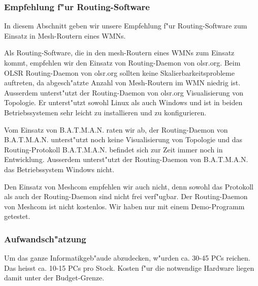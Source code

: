 \subsubsection{Empfehlung f"ur Routing-Software}

In diesem Abschnitt geben wir unsere Empfehlung f"ur Routing-Software
zum Einsatz in Mesh-Routern eines WMNs.

Als Routing-Software, die in den mesh-Routern eines WMNs zum Einsatz kommt,
empfehlen wir den Einsatz von Routing-Daemon von olsr.org. Beim OLSR
Routing-Daemon von olsr.org sollten keine Skalierbarkeitsprobleme auftreten,
da abgesch"atzte Anzahl von Mesh-Routern im WMN niedrig ist. Ausserdem
unterst"utzt der Routing-Daemon von olsr.org Visualisierung von Topologie.
Er unterst"utzt sowohl Linux als auch Windows und ist in beiden
Betriebssystemen sehr leicht zu installieren und zu konfigurieren.

Vom Einsatz von B.A.T.M.A.N. raten wir ab, der Routing-Daemon von
B.A.T.M.A.N. unterst"utzt noch keine Visualisierung von Topologie
und das Routing-Protokoll B.A.T.M.A.N.  befindet sich zur Zeit immer
noch in Entwicklung.  Ausserdem unterst"utzt der Routing-Daemon von
B.A.T.M.A.N. das Betriebssystem Windows nicht.

Den Einsatz von Meshcom empfehlen wir auch nicht, denn sowohl das
Protokoll als auch der Routing-Daemon sind nicht frei verf"ugbar.
Der Routing-Daemon von Meshcom ist nicht kostenlos. Wir haben nur mit
einem Demo-Programm getestet.

\subsubsection{Aufwandsch"atzung}
\label{sec:Aufwandsch"atzung}
	
Um das ganze Informatikgeb"aude abzudecken, w"urden ca. 30-45 PCs reichen.
Das heisst ca. 10-15 PCs pro Stock. Kosten f"ur die notwendige Hardware
liegen damit unter der Budget-Grenze.
